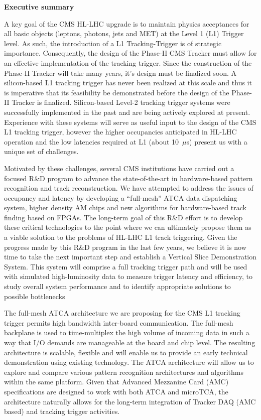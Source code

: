 \begin{center}
{\Large\bf Executive summary}
\end{center}

\vspace{0.5cm}

\noindent A key goal of the CMS HL-LHC upgrade is to maintain physics acceptances for all basic objects (leptons, photons, jets and MET) at the Level 1 (L1) Trigger level. As such, the introduction of a L1 Tracking-Trigger is of strategic importance.  Consequently, the design of the Phase-II CMS Tracker must allow for an effective implementation of the tracking trigger.  Since the construction of the Phase-II Tracker will take many years, it's design must be finalized soon.  A silicon-based L1 tracking trigger has never been realized at this scale and thus it is imperative that its feasibility be demonstrated before the design of the Phase-II Tracker is finalized.  Silicon-based Level-2 tracking trigger systems were successfully implemented in the past and are being actively explored at present. Experience with these systems will serve as useful input to the design of the CMS L1 tracking trigger, however the higher occupancies anticipated in HL-LHC operation and the low latencies required at L1 (about 10~$\mu$s) present us with a unique set of challenges.

\noindent Motivated by these challenges, several CMS institutions have carried out a focused R\&D program to advance the state-of-the-art in hardware-based pattern recognition and track reconstruction.  We have attempted to address the issues of occupancy and latency by developing a ``full-mesh'' ATCA data dispatching system, higher density AM chips and new algorithms for hardware-based track finding based on  FPGAs.  The long-term goal of this R\&D effort is to develop these critical technologies to the point where we can ultimately propose them as a viable solution to the problems of HL-LHC L1 track triggering.  Given the progress made by this R\&D program in the last few years, we believe it is now time to take the next important  step and establish a Vertical Slice Demonstration System. This system will comprise a full tracking trigger path and will be used with simulated high-luminosity data to measure trigger latency and efficiency, to study overall system performance and to identify appropriate solutions to possible bottlenecks

\noindent The full-mesh ATCA architecture we are proposing for the CMS L1 tracking trigger permits high bandwidth inter-board communication.  The full-mesh backplane is used to time-multiplex the high volume of incoming data in such a way that I/O demands are manageable at the board and chip level.  The resulting architecture is scalable, flexible and will enable us to provide an early technical demonstration using existing technology. The ATCA architecture will allow us to explore and compare various pattern recognition architectures and algorithms within the same platform.  Given that Advanced Mezzanine Card (AMC) specifications are designed to work with both ATCA and microTCA, the architecture naturally allows for the long-term integration of Tracker DAQ (AMC based) and tracking trigger activities.  


